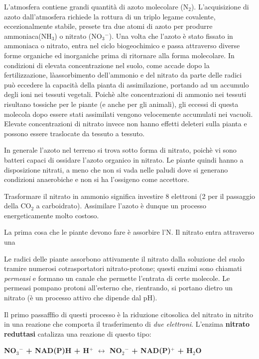\documentclass[]{article}
\begin{document}
L'atmosfera contiene grandi quantità di azoto molecolare (N$_2$).
L'acquisizione di azoto dall'atmosfera richiede la rottura di un triplo
legame covalente, eccezionalmente stabile, presete tra due atomi di
azoto per produrre ammoniaca(NH$_3$) o nitrato (NO$_3$$^-$). Una volta
che l'azoto è stato fissato in ammoniaca o nitrato, entra nel ciclo
biogeochimico e passa attraverso diverse forme organiche ed inorganiche
prima di ritornare alla forma molecolare. In condizioni di elevata
concentrazione nel suolo, come accade dopo la fertilizzazione,
làassorbimento dell'ammonio e del nitrato da parte delle radici può
eccedere la capacità della pianta di assimilazione, portando ad un
accumulo degli ioni nei tessuti vegetali. Poichè alte concentrazioni di
ammonio nei tessuti risultano tossiche per le piante (e anche per gli
animali), gli eccessi di questa molecola dopo essere stati assimilati
vengono velocemente accumulati nei vacuoli. Elevate concentrazioni di
nitrato invece non hanno effetti deleteri sulla pianta e possono essere
traslocate da tessuto a tessuto.

In generale l'azoto nel terreno si trova sotto forma di nitrato, poichè
vi sono batteri capaci di ossidare l'azoto organico in nitrato. Le
piante quindi hanno a disposizione nitrati, a meno che non si vada nelle
paludi dove si generano condizioni anaerobiche e non si ha l'ossigeno
come accettore.

Trasformare il nitrato in ammonio significa investire 8 elettroni (2 per
il passaggio della CO$_2$ a carboidrato). Assimilare l'azoto è dunque un
processo energeticamente molto costoso.

La prima cosa che le piante devono fare è assorbire l'N. Il nitrato
entra attraverso una

Le radici delle piante assorbono attivamente il nitrato dalla soluzione
del suolo tramire numerosi cotrasportatori nitrato-protone; questi
enzimi sono chiamati \emph{permeasi} e formano un canale che permette
l'entrata di certe molecole. Le permeasi pompano protoni all'esterno
che, rientrando, si portano dietro un nitrato (è un processo attivo che
dipende dal pH).

Il primo passafffio di questi processo è la riduzione citosolica del
nitrato in nitrito in una reazione che comporta il trasferimento di
\emph{due elettroni}. L'enzima \textbf{nitrato reduttasi} catalizza una
reazione di questo tipo:

\textbf{NO$_3$$^-$ + NAD(P)H + H$^+$ $\longleftrightarrow$ NO$_2$$^-$ +
NAD(P)$^+$ + H$_2$O}
\end{document}
